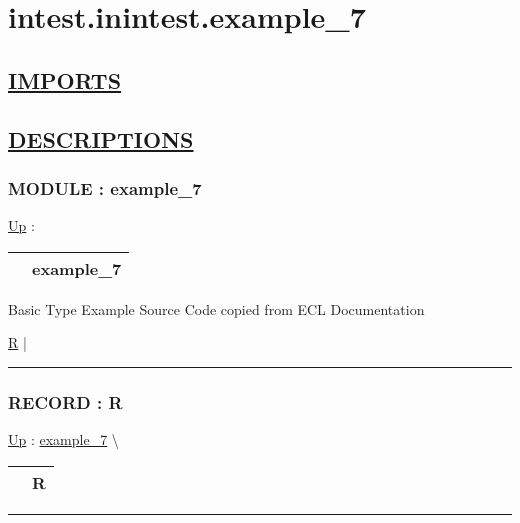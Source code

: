 \chapter*{intest.inintest.example\_7}
\hypertarget{ecldoc:toc:intest.inintest.example_7}{}

\section*{\underline{IMPORTS}}

\section*{\underline{DESCRIPTIONS}}
\subsection*{MODULE : example\_7}
\hypertarget{ecldoc:intest.inintest.example_7}{}
\hyperlink{ecldoc:toc:intest/inintest}{Up} :

{\renewcommand{\arraystretch}{1.5}
\begin{tabularx}{\textwidth}{|>{\raggedright\arraybackslash}l|X|}
\hline
\hspace{0pt} & example\_7 \\
\hline
\end{tabularx}
}

\par
Basic Type Example Source Code copied from ECL Documentation


\hyperlink{ecldoc:intest.inintest.example_7.r}{R}  |

\rule{\linewidth}{0.5pt}

\subsection*{RECORD : R}
\hypertarget{ecldoc:intest.inintest.example_7.r}{}
\hyperlink{ecldoc:intest.inintest.example_7}{Up} :
\hspace{0pt} \hyperlink{ecldoc:intest.inintest.example_7}{example_7} \textbackslash 

{\renewcommand{\arraystretch}{1.5}
\begin{tabularx}{\textwidth}{|>{\raggedright\arraybackslash}l|X|}
\hline
\hspace{0pt} & R \\
\hline
\end{tabularx}
}

\par


\rule{\linewidth}{0.5pt}


